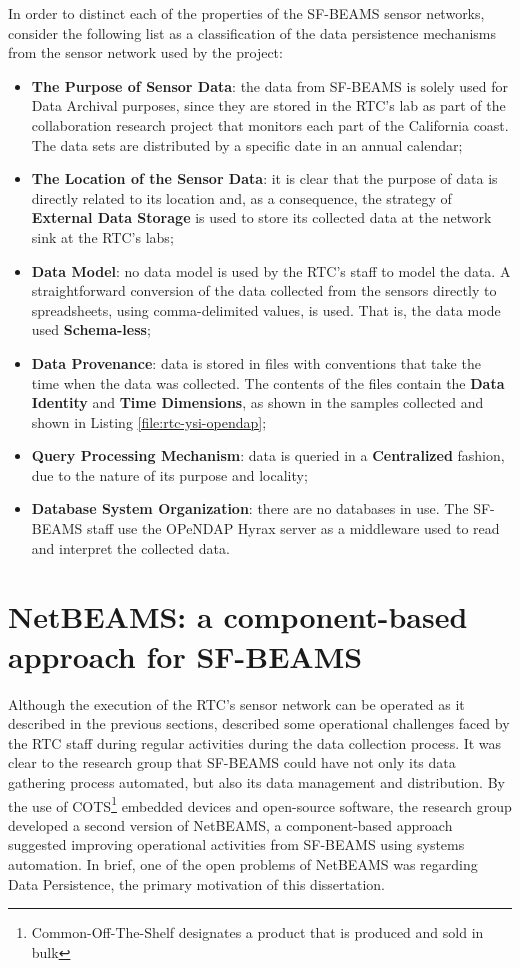 In order to distinct each of the properties of the SF-BEAMS sensor networks,
consider the following list as a classification of the data persistence
mechanisms from the sensor network used by the project:

\begin{itemize}
  \item \textbf{The Purpose of Sensor Data}: the data from SF-BEAMS is solely
  used for Data Archival purposes, since they are stored in the RTC's lab as
  part of the collaboration research project that monitors each part of the
  California coast. The data sets are distributed by a specific date in an
  annual calendar;
  \item \textbf{The Location of the Sensor Data}: it is clear that the purpose
  of data is directly related to its location and, as a consequence, the
  strategy of \textbf{External Data Storage} is used to store its collected
  data at the network sink at the RTC's labs;
  \item \textbf{Data Model}: no data model is used by the RTC's staff to model
  the data. A straightforward conversion of the data collected from the sensors
  directly to spreadsheets, using comma-delimited values, is used. That is, the
  data mode used \textbf{Schema-less};
  \item \textbf{Data Provenance}: data is stored in files with conventions that
  take the time when the data was collected. The contents of the files contain
  the \textbf{Data Identity} and \textbf{Time Dimensions}, as shown in the
  samples collected and shown in Listing \ref{file:rtc-ysi-opendap};
  \item \textbf{Query Processing Mechanism}: data is queried in a
  \textbf{Centralized} fashion, due to the nature of its purpose and locality;
  \item \textbf{Database System Organization}: there are no databases in use.
  The SF-BEAMS staff use the OPeNDAP Hyrax server as a middleware used to read
  and interpret the collected data. 
\end{itemize}

\section{NetBEAMS: a component-based approach for SF-BEAMS}
\label{sec:problem-requirements}

Although the execution of the RTC's sensor network can be operated as it
described in the previous sections, \cite{netbeams2009} described some
operational challenges faced by the RTC staff during regular activities during
the data collection process. It was clear to the research group that SF-BEAMS
could have not only its data gathering process automated, but also its data
management and distribution. By the use of COTS\footnote{Common-Off-The-Shelf
designates a product that is produced and sold in bulk} embedded devices and
open-source \cite{open-source} software, the research group developed a second
version of NetBEAMS, a component-based approach suggested improving
operational activities from SF-BEAMS using systems automation. In brief, one
of the open problems of NetBEAMS was regarding Data Persistence, the primary
motivation of this dissertation.

